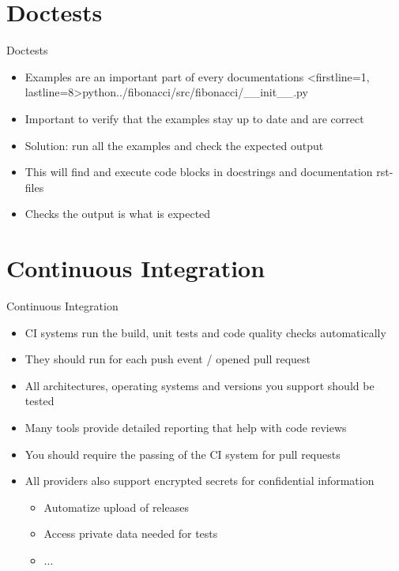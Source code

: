 \section{Doctests}

\begin{frame}[c, fragile]{Doctests}
  \begin{itemize}
    \item Examples are an important part of every documentations
      <firstline=1, lastline=8>{python}{../fibonacci/src/fibonacci/__init__.py}
    \item Important to verify that the examples stay up to date and are correct
    \item Solution: run all the examples and check the expected output
    \item This will find and execute code blocks in docstrings and documentation rst-files
    \item Checks the output is what is expected
  \end{itemize}
\end{frame}

\section{Continuous Integration}
\begin{frame}[c]{Continuous Integration}
  \begin{itemize}
    \item CI systems run the build, unit tests and code quality checks automatically
    \item They should run for each push event / opened pull request
    \item All architectures, operating systems and versions you support should be tested
    \item Many tools provide detailed reporting that help with code reviews
    \item You should require the passing of the CI system for pull requests
    \item All providers also support encrypted secrets for confidential information\\
      \begin{itemize}
        \item Automatize upload of releases
        \item Access private data needed for tests
        \item ...
      \end{itemize}
  \end{itemize}
\end{frame}

